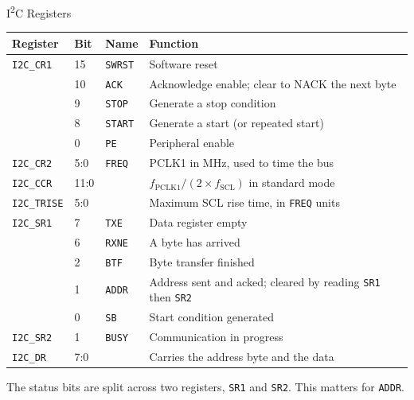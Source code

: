 \documentclass[9pt,aspectratio=169,xcolor=table]{beamer}
\begin{document}
\begin{frame}{I\textsuperscript{2}C Registers}
    \begin{center}
    {\scriptsize
    \striped
    \begin{tabular}{@{}l l l R{.46\textwidth}@{}}
        \toprule
        \textbf{Register} & \textbf{Bit} & \textbf{Name} & \textbf{Function} \\
        \midrule
        \texttt{I2C\_CR1} & 15 & \texttt{SWRST} & Software reset \\
                          & 10 & \texttt{ACK}   & Acknowledge enable; clear to NACK the next byte \\
                          & 9  & \texttt{STOP}  & Generate a stop condition \\
                          & 8  & \texttt{START} & Generate a start (or repeated start) \\
                          & 0  & \texttt{PE}    & Peripheral enable \\
        \texttt{I2C\_CR2} & 5:0 & \texttt{FREQ} & PCLK1 in MHz, used to time the bus \\
        \texttt{I2C\_CCR} & 11:0 & & $f_{\text{PCLK1}} / (2 \times f_{\text{SCL}})$ in standard mode \\
        \texttt{I2C\_TRISE} & 5:0 & & Maximum SCL rise time, in \texttt{FREQ} units \\
        \texttt{I2C\_SR1} & 7 & \texttt{TXE}  & Data register empty \\
                          & 6 & \texttt{RXNE} & A byte has arrived \\
                          & 2 & \texttt{BTF}  & Byte transfer finished \\
                          & 1 & \texttt{ADDR} & Address sent and acked; cleared by reading \texttt{SR1} then \texttt{SR2} \\
                          & 0 & \texttt{SB}   & Start condition generated \\
        \texttt{I2C\_SR2} & 1 & \texttt{BUSY} & Communication in progress \\
        \texttt{I2C\_DR}  & 7:0 &             & Carries the address byte and the data \\
        \bottomrule
    \end{tabular}}
    \end{center}

    \vspace{1mm}
    {\small The status bits are split across \alert{two} registers, \texttt{SR1} and \texttt{SR2}. This matters for \texttt{ADDR}.}
\end{frame}
\end{document}

